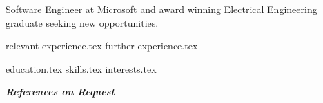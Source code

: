 \documentclass[letterpaper,11pt]{article}
\begin{document}
\thispagestyle{empty}

\vspace{0.8cm} 

Software Engineer at Microsoft and award winning Electrical Engineering graduate seeking new opportunities.



{relevant experience.tex}
{further experience.tex}


\newpage
{education.tex}
{skills.tex}
{interests.tex}
\thispagestyle{empty}

\centering
\textit{\textbf{References on Request}}
\end{document}
